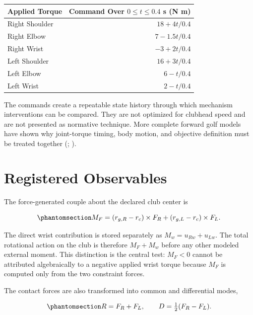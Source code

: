 \documentclass[
  letterpaper,
]{report}
\begin{document}
\begin{longtable}[]{@{}lr@{}}
\toprule\noalign{}
Applied Torque & Command Over \(0\le t\le0.4\) s (N m) \\
\midrule\noalign{}
\endhead
\bottomrule\noalign{}
\endlastfoot
Right Shoulder & \(18+4t/0.4\) \\
Right Elbow & \(7-1.5t/0.4\) \\
Right Wrist & \(-3+2t/0.4\) \\
Left Shoulder & \(16+3t/0.4\) \\
Left Elbow & \(6-t/0.4\) \\
Left Wrist & \(2-t/0.4\) \\
\end{longtable}

The commands create a repeatable state history through which mechanism
interventions can be compared. They are not optimized for clubhead speed
and are not presented as normative technique. More complete forward golf
models have shown why joint-torque timing, body motion, and objective
definition must be treated together
(;
).

\section{Registered Observables}\label{sec-forward-two-hand-observables}

The force-generated couple about the declared club center is

\begin{equation}\phantomsection\label{eq-forward-two-hand-force-couple}{
M_F =
(r_{g,R}-r_c)\times F_R+
(r_{g,L}-r_c)\times F_L.
}\end{equation}

The direct wrist contribution is stored separately as
\(M_w=u_{Rw}+u_{Lw}\). The total rotational action on the club is
therefore \(M_F+M_w\) before any other modeled external moment. This
distinction is the central test: \(M_F<0\) cannot be attributed
algebraically to a negative applied wrist torque because \(M_F\) is
computed only from the two constraint forces.

The contact forces are also transformed into common and differential
modes,

\begin{equation}\phantomsection\label{eq-forward-two-hand-modes}{
R=F_R+F_L,
\qquad
D=\tfrac12(F_R-F_L).
}\end{equation}
\end{document}
